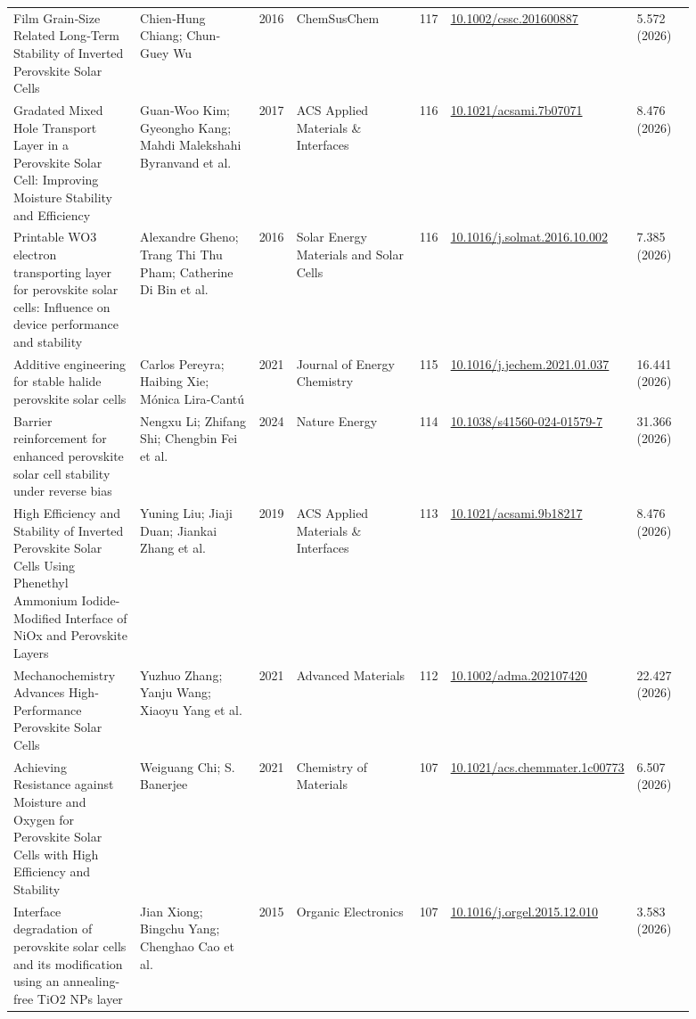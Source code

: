 \documentclass[10pt,a4paper]{article}
\begin{document}
{\begin{longtable}{p{0.197\linewidth}p{0.197\linewidth}p{0.043\linewidth}p{0.197\linewidth}p{0.043\linewidth}p{0.117\linewidth}p{0.098\linewidth}}
Film Grain‐Size Related Long‐Term Stability of Inverted Perovskite Solar Cells & Chien‐Hung Chiang; Chun‐Guey Wu & 2016 & ChemSusChem & 117 & \href{https://doi.org/10.1002/cssc.201600887}{10.1002/cssc.201600887} & 5.572 (2026) \\
Gradated Mixed Hole Transport Layer in a Perovskite Solar Cell: Improving Moisture Stability and Efficiency & Guan‐Woo Kim; Gyeongho Kang; Mahdi Malekshahi Byranvand et al. & 2017 & ACS Applied Materials \& Interfaces & 116 & \href{https://doi.org/10.1021/acsami.7b07071}{10.1021/acsami.7b07071} & 8.476 (2026) \\
Printable WO3 electron transporting layer for perovskite solar cells: Influence on device performance and stability & Alexandre Gheno; Trang Thi Thu Pham; Catherine Di Bin et al. & 2016 & Solar Energy Materials and Solar Cells & 116 & \href{https://doi.org/10.1016/j.solmat.2016.10.002}{10.1016/j.solmat.2016.10.002} & 7.385 (2026) \\
Additive engineering for stable halide perovskite solar cells & Carlos Pereyra; Haibing Xie; Mónica Lira‐Cantú & 2021 & Journal of Energy Chemistry & 115 & \href{https://doi.org/10.1016/j.jechem.2021.01.037}{10.1016/j.jechem.2021.01.037} & 16.441 (2026) \\
Barrier reinforcement for enhanced perovskite solar cell stability under reverse bias & Nengxu Li; Zhifang Shi; Chengbin Fei et al. & 2024 & Nature Energy & 114 & \href{https://doi.org/10.1038/s41560-024-01579-7}{10.1038/s41560-024-01579-7} & 31.366 (2026) \\
High Efficiency and Stability of Inverted Perovskite Solar Cells Using Phenethyl Ammonium Iodide-Modified Interface of NiOx and Perovskite Layers & Yuning Liu; Jiaji Duan; Jiankai Zhang et al. & 2019 & ACS Applied Materials \& Interfaces & 113 & \href{https://doi.org/10.1021/acsami.9b18217}{10.1021/acsami.9b18217} & 8.476 (2026) \\
Mechanochemistry Advances High‐Performance Perovskite Solar Cells & Yuzhuo Zhang; Yanju Wang; Xiaoyu Yang et al. & 2021 & Advanced Materials & 112 & \href{https://doi.org/10.1002/adma.202107420}{10.1002/adma.202107420} & 22.427 (2026) \\
Achieving Resistance against Moisture and Oxygen for Perovskite Solar Cells with High Efficiency and Stability & Weiguang Chi; S. Banerjee & 2021 & Chemistry of Materials & 107 & \href{https://doi.org/10.1021/acs.chemmater.1c00773}{10.1021/acs.chemmater.1c00773} & 6.507 (2026) \\
Interface degradation of perovskite solar cells and its modification using an annealing-free TiO2 NPs layer & Jian Xiong; Bingchu Yang; Chenghao Cao et al. & 2015 & Organic Electronics & 107 & \href{https://doi.org/10.1016/j.orgel.2015.12.010}{10.1016/j.orgel.2015.12.010} & 3.583 (2026) \\

\end{longtable}}
\end{document}
